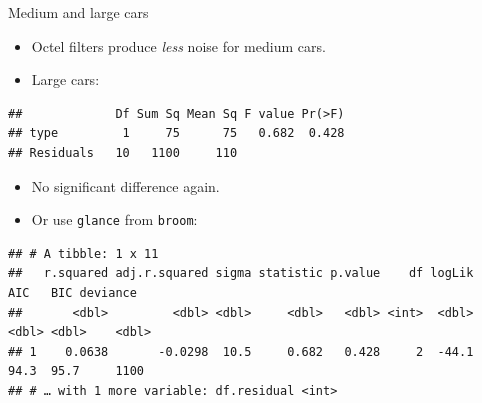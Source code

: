 \documentclass[ignorenonframetext,]{beamer}
\newenvironment{Shaded}{\begin{snugshade}}{\end{snugshade}}
\newcommand{\DataTypeTok}[1]{\textcolor[rgb]{0.13,0.29,0.53}{#1}}
\newcommand{\KeywordTok}[1]{\textcolor[rgb]{0.13,0.29,0.53}{\textbf{#1}}}
\newcommand{\NormalTok}[1]{#1}
\newcommand{\OperatorTok}[1]{\textcolor[rgb]{0.81,0.36,0.00}{\textbf{#1}}}
\newcommand{\StringTok}[1]{\textcolor[rgb]{0.31,0.60,0.02}{#1}}
\begin{document}
\begin{frame}[fragile]{Medium and large cars}
\protect\hypertarget{medium-and-large-cars}{}

\begin{itemize}
\item
  Octel filters produce \emph{less} noise for medium cars.
\item
  Large cars:
\end{itemize}

\begin{Shaded}
\end{Shaded}

\begin{verbatim}
##             Df Sum Sq Mean Sq F value Pr(>F)
## type         1     75      75   0.682  0.428
## Residuals   10   1100     110
\end{verbatim}

\begin{itemize}
\item
  No significant difference again.
\item
  Or use \texttt{glance} from \texttt{broom}:
\end{itemize}

\begin{Shaded}
\end{Shaded}

\begin{verbatim}
## # A tibble: 1 x 11
##   r.squared adj.r.squared sigma statistic p.value    df logLik   AIC   BIC deviance
##       <dbl>         <dbl> <dbl>     <dbl>   <dbl> <int>  <dbl> <dbl> <dbl>    <dbl>
## 1    0.0638       -0.0298  10.5     0.682   0.428     2  -44.1  94.3  95.7     1100
## # … with 1 more variable: df.residual <int>
\end{verbatim}

\end{frame}
\end{document}
